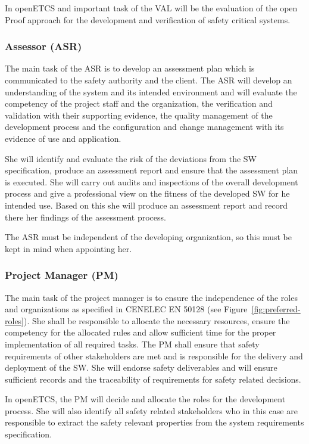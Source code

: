 In openETCS and important task of the VAL will be the evaluation of the open
Proof approach for the development and verification of safety critical systems.

\subsubsection{Assessor (ASR)}
\label{sec:assessor}

The main task of the ASR is to develop an assessment plan which is communicated
to the safety authority and the client. The ASR will develop an understanding of
the system and its intended environment and will evaluate the competency of the
project staff and the organization, the verification and validation with their
supporting evidence, the quality management of the development process and the
configuration and change management with its evidence of use and application.

She will identify and evaluate the risk of the deviations from the SW
specification, produce an assessment report and ensure that the assessment plan
is executed. She will carry out audits and inspections of the overall
development process and give a professional view on the fitness of the developed
SW for he intended use. Based on this she will produce an assessment report and
record there her findings of the assessment process.

The ASR must be independent of the developing organization, so this must be kept
in mind when appointing her.

\subsubsection{Project Manager (PM)}
\label{sec:project-manager}

The main task of the project manager is to ensure the independence of the roles
and organizations as specified in CENELEC EN 50128 (see
Figure~\ref{fig:preferred-roles}). She shall be responsible to allocate the
necessary resources, ensure the competency for the allocated rules and allow
sufficient time for the proper implementation of all required tasks. The PM
shall ensure that safety requirements of other stakeholders are met and is
responsible for the delivery and deployment of the SW. She will endorse safety
deliverables and will ensure sufficient records and the traceability of
requirements for safety related decisions.

In openETCS, the PM will decide and allocate the roles for the development
process. She will also identify all safety related stakeholders who in this case
are responsible to extract the safety relevant properties from the system
requirements specification.


